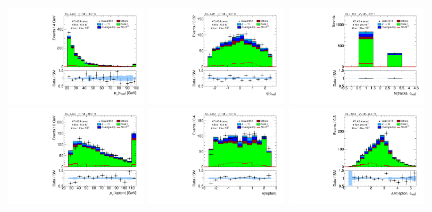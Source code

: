 \clearpage
\begin{figure}[tp]
  \centering
  \includegraphics[width=0.32\textwidth]{figures/analysis/vbf-WlvCR/tau-pt}
  \includegraphics[width=0.32\textwidth]{figures/analysis/vbf-WlvCR/tau-eta}
  \includegraphics[width=0.32\textwidth]{figures/analysis/vbf-WlvCR/tau-numTrack}
  \includegraphics[width=0.32\textwidth]{figures/analysis/vbf-WlvCR/lep-pt-hi}
  \includegraphics[width=0.32\textwidth]{figures/analysis/vbf-WlvCR/lep-eta}
  \includegraphics[width=0.32\textwidth]{figures/analysis/vbf-WlvCR/taulep-dR}

\end{figure}
